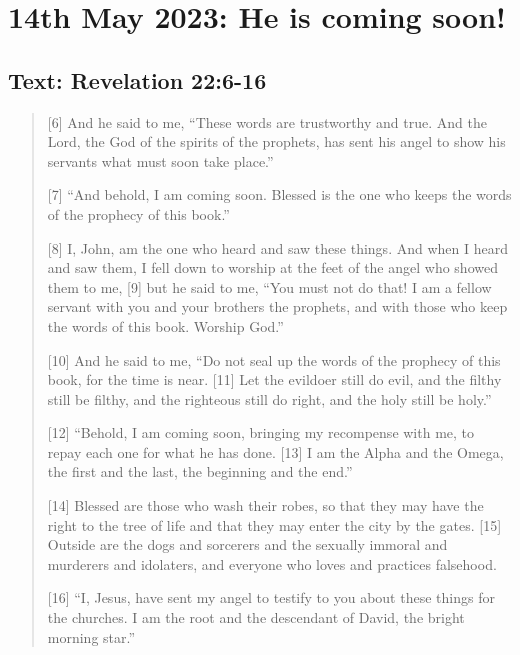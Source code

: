 \setcounter{figure}{0}

\section{14th May 2023: He is coming soon!}
\subsection*{Text: Revelation 22:6-16}
  \begin{quote}
    [6] And he said to me, “These words are trustworthy and true. And the
    Lord, the God of the spirits of the prophets, has sent his angel to show
    his servants what must soon take place.”

    [7] “And behold, I am coming soon. Blessed is the one who keeps the words
    of the prophecy of this book.”

    [8] I, John, am the one who heard and saw these things. And when I heard
    and saw them, I fell down to worship at the feet of the angel who showed
    them to me, [9] but he said to me, “You must not do that! I am a fellow
    servant with you and your brothers the prophets, and with those who keep
    the words of this book. Worship God.”

    [10] And he said to me, “Do not seal up the words of the prophecy of this
    book, for the time is near. [11] Let the evildoer still do evil, and the
    filthy still be filthy, and the righteous still do right, and the holy
    still be holy.”

    [12] “Behold, I am coming soon, bringing my recompense with me, to repay
    each one for what he has done. [13] I am the Alpha and the Omega, the
    first and the last, the beginning and the end.”

    [14] Blessed are those who wash their robes, so that they may have the
    right to the tree of life and that they may enter the city by the gates.
    [15] Outside are the dogs and sorcerers and the sexually immoral and
    murderers and idolaters, and everyone who loves and practices falsehood.

    [16] “I, Jesus, have sent my angel to testify to you about these things
    for the churches. I am the root and the descendant of David, the bright
    morning star.”
  \end{quote}
